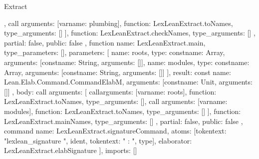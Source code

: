 \begin{lexlean}{Extract}
\begin{toolingmodule}
{{{{          },
          call{
            arguments: [var{name: plumbing}],
            function: LexLeanExtract.toNames,
            type_arguments: []
          }
        ],
        function: LexLeanExtract.checkNames,
        type_arguments: []
      },
      partial: false,
      public: false
    },
    function{
      name: LexLeanExtract.main,
      type_parameters: [],
      parameters: [
        {name: roots, type: const{name: Array, arguments: [const{name: String, arguments: []}]}},
        {name: modules, type: const{name: Array, arguments: [const{name: String, arguments: []}]}}
      ],
      result: const{
        name: Lean.Elab.Command.CommandElabM,
        arguments: [const{name: Unit, arguments: []}]
      },
      body: call{
        arguments: [
          call{arguments: [var{name: roots}], function: LexLeanExtract.toNames, type_arguments: []},
          call{
            arguments: [var{name: modules}],
            function: LexLeanExtract.toNames,
            type_arguments: []
          }
        ],
        function: LexLeanExtract.mainNames,
        type_arguments: []
      },
      partial: false,
      public: false
    },
    command{
      name: LexLeanExtract.signatureCommand,
      atoms: [token{text: "lexlean_signature "}, ident{}, token{text: " : "}, type{}],
      elaborator: LexLeanExtract.elabSignature
    }
  ],
  imports: []
}
\end{toolingmodule}
\end{lexlean}
